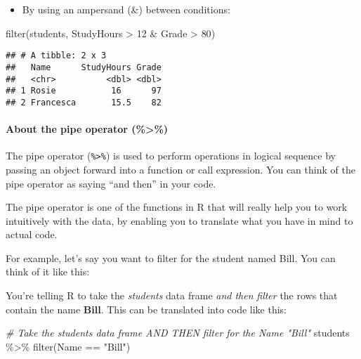 \documentclass[
]{article}
\newenvironment{Shaded}{\begin{snugshade}}{\end{snugshade}}
\newcommand{\CommentTok}[1]{\textcolor[rgb]{0.56,0.35,0.01}{\textit{#1}}}
\newcommand{\DecValTok}[1]{\textcolor[rgb]{0.00,0.00,0.81}{#1}}
\newcommand{\FunctionTok}[1]{\textcolor[rgb]{0.00,0.00,0.00}{#1}}
\newcommand{\NormalTok}[1]{#1}
\newcommand{\SpecialCharTok}[1]{\textcolor[rgb]{0.00,0.00,0.00}{#1}}
\newcommand{\StringTok}[1]{\textcolor[rgb]{0.31,0.60,0.02}{#1}}
\providecommand{\tightlist}{%
  \setlength{\itemsep}{0pt}\setlength{\parskip}{0pt}}
\begin{document}
\begin{itemize}
\tightlist
\item
  By using an ampersand (\&) between conditions:
\end{itemize}

\begin{Shaded}
\begin{Highlighting}[]
\FunctionTok{filter}\NormalTok{(students, StudyHours }\SpecialCharTok{\textgreater{}} \DecValTok{12} \SpecialCharTok{\&}\NormalTok{ Grade }\SpecialCharTok{\textgreater{}} \DecValTok{80}\NormalTok{)}
\end{Highlighting}
\end{Shaded}

\begin{verbatim}
## # A tibble: 2 x 3
##   Name      StudyHours Grade
##   <chr>          <dbl> <dbl>
## 1 Rosie           16      97
## 2 Francesca       15.5    82
\end{verbatim}

\hypertarget{about-the-pipe-operator}{%
\paragraph{About the pipe operator
(\%\textgreater\%)}\label{about-the-pipe-operator}}

The pipe operator (\texttt{\%\textgreater{}\%}) is used to perform
operations in logical sequence by passing an object forward into a
function or call expression. You can think of the pipe operator as
saying ``and then'' in your code.

The pipe operator is one of the functions in R that will really help you
to work intuitively with the data, by enabling you to translate what you
have in mind to actual code.

For example, let's say you want to filter for the student named Bill.
You can think of it like this:

You're telling R to take the \emph{students} data frame \emph{and then}
\emph{filter} the rows that contain the name \textbf{Bill}. This can be
translated into code like this:

\begin{Shaded}
\begin{Highlighting}[]
\CommentTok{\# Take the students data frame AND THEN filter for the Name "Bill"}
\NormalTok{students }\SpecialCharTok{\%\textgreater{}\%} 
  \FunctionTok{filter}\NormalTok{(Name }\SpecialCharTok{==} \StringTok{"Bill"}\NormalTok{)}
\end{Highlighting}
\end{Shaded}
\end{document}
